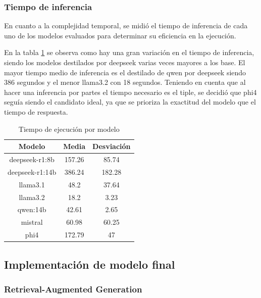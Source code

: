 \documentclass[../main.tex]{subfiles}
\begin{document}
\subsubsection{Tiempo de inferencia}

En cuanto a la complejidad temporal, se midió el tiempo de inferencia de cada uno de los modelos evaluados para determinar su eficiencia en la ejecución.

En la tabla \ref{tab:modelos_tiempo} se observa como hay una gran variación en el tiempo de inferencia, siendo los modelos destilados por deepseek varias veces mayores a los base. El mayor tiempo medio de inferencia es el destilado de qwen por deepseek siendo 386 segundos y el menor llama3.2 con 18 segundos.
Teniendo en cuenta que al hacer una inferencia por partes el tiempo necesario es el tiple, se decidió que phi4 seguía siendo el candidato ideal, ya que se prioriza la exactitud del modelo que el tiempo de respuesta.

\begin{table}[H]
    \centering
    \caption{Tiempo de ejecución por modelo}
    \label{tab:modelos_tiempo}
    \renewcommand{\arraystretch}{1.2}
    \begin{tabular}{ccc}
        \hline
        \textbf{Modelo} & \textbf{Media} & \textbf{Desviación} \\
        \hline
        deepseek-r1:8b & 157.26 & 85.74 \\
        deepseek-r1:14b & 386.24 & 182.28 \\
        llama3.1 & 48.2 & 37.64 \\
        llama3.2 & 18.2 & 3.23 \\
        qwen:14b & 42.61 & 2.65 \\
        mistral & 60.98 & 60.25 \\
        phi4 & 172.79 & 47 \\
        
        \hline
    \end{tabular}

\end{table}


\subsection{Implementación de modelo final}
\subsubsection{Retrieval-Augmented Generation}
\end{document}
